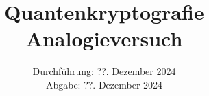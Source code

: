 

\subject{\texorpdfstring{\vspace{2ex}}{}V00\texorpdfstring{\vspace{-2ex}}{}} %
\title{Quantenkryptografie Analogieversuch} %
\date{
	Durchführung: ??. Dezember 2024 %
	\\ Abgabe: ??. Dezember 2024 %
}





\maketitle
\thispagestyle{empty}

\tableofcontents
\newpage








\printbibliography{}

\newpage



